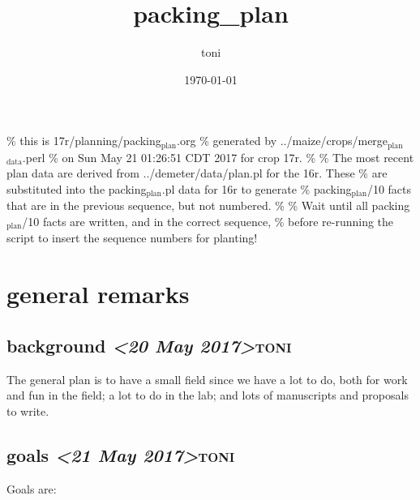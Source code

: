 \documentclass[11pt]{article}
\author{toni}
\date{\today}
\title{packing\_plan}
\begin{document}
\maketitle
\tableofcontents

\% this is 17r/planning/packing$_{\text{plan}}$.org
\% generated by ../maize/crops/merge$_{\text{plan}}$$_{\text{data}}$.perl
\% on Sun May 21 01:26:51 CDT 2017 for crop 17r.
\%
\% The most recent plan data are derived from ../demeter/data/plan.pl for the 16r.  These
\% are substituted into the packing$_{\text{plan}}$.pl data for 16r to generate
\% packing$_{\text{plan}}$/10 facts that are in the previous sequence, but not numbered.
\%
\% Wait until all packing$_{\text{plan}}$/10 facts are written, and in the correct sequence,
\% before re-running the script to insert the sequence numbers for planting!


\section{general remarks}
\label{sec-1}


\subsection{background \textit{<20 May 2017>}\hfill{}\textsc{toni}}
\label{sec-1-1}

The general plan is to have a small field since we have a lot to do, both
for work and fun in the field; a lot to do in the lab; and lots of
manuscripts and proposals to write.




\subsection{goals  \textit{<21 May 2017>}\hfill{}\textsc{toni}}
\label{sec-1-2}


Goals are:
\end{document}
